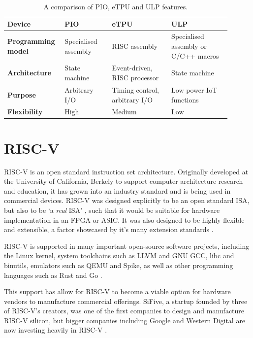 \begin{table}[h!]
    \centering
    \begin{tabular}{|p{0.2\linewidth}|p{0.2\linewidth}|p{0.25\linewidth}|p{0.25\linewidth}|}
        \hline
        \textbf{Device}            & \textbf{PIO}         & \textbf{eTPU}                 & \textbf{ULP}                         \\ \hline
        \textbf{Programming model} & Specialised assembly & RISC assembly                 & Specialised assembly or C/C++ macros \\ \hline
        \textbf{Architecture}      & State machine        & Event-driven, RISC processor  & State machine                        \\ \hline
        \textbf{Purpose}           & Arbitrary I/O        & Timing control, arbitrary I/O & Low power IoT functions              \\ \hline
        \textbf{Flexibility}       & High                 & Medium                        & Low                                  \\ \hline
    \end{tabular}
    \caption{A comparison of PIO, eTPU and ULP features.}
    \label{tab:comparison}
\end{table}

\section{RISC-V}

RISC-V is an open standard instruction set architecture. Originally developed at the University of California, Berkely to support computer architecture research and education, it has grown into an industry standard and is being used in commercial devices. RISC-V was designed explicitly to be an open standard ISA, but also to be `a \textit{real} ISA' \cite{riscv_design}, such that it would be suitable for hardware implementation in an FPGA or ASIC. It was also designed to be highly flexible and extensible, a factor showcased by it's many extension standards \cite{riscv_spec}.

RISC-V is supported in many important open-source software projects, including the Linux kernel, system toolchains such as LLVM and GNU GCC, libc and binutils, emulators such as QEMU and Spike, as well as other programming languages such as Rust and Go \cite{riscv_wiki}.

This support has allow for RISC-V to become a viable option for hardware vendors to manufacture commercial offerings. SiFive, a startup founded by three of RISC-V's creators, was one of the first companies to design and manufacture RISC-V silicon, but bigger companies including Google and Western Digital are now investing heavily in RISC-V \cite{riscv_article}.

